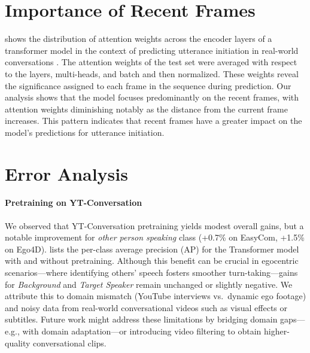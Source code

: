 \documentclass[11pt]{article}
\begin{document}

\section {Importance of Recent Frames}

 shows the distribution of attention weights across the encoder layers of a transformer model in the context of predicting utterance initiation in real-world conversations \cite{wang2021oadtr}. The attention weights of the test set were averaged with respect to the layers, multi-heads, and batch and then normalized.  These weights reveal the significance assigned to each frame in the sequence during prediction. Our analysis shows that the model focuses predominantly on the recent frames, with attention weights diminishing notably as the distance from the current frame increases. This pattern indicates that recent frames have a greater impact on the model's predictions for utterance initiation. 




\section{Error Analysis}
\label{app:error_analysis}
\paragraph{Pretraining on YT-Conversation}

We observed that YT-Conversation pretraining yields modest overall gains, but a notable improvement for \emph{other person speaking} class (+0.7\% on EasyCom, +1.5\% on Ego4D). 
 lists the per-class average precision (AP) for the Transformer 
model with and without pretraining. Although this benefit can be crucial in egocentric 
scenarios—where identifying others’ speech fosters smoother turn-taking—gains for 
\textit{Background} and \textit{Target Speaker} remain unchanged or slightly negative. 
We attribute this to domain mismatch (YouTube interviews vs.\ dynamic ego footage) 
and noisy data from real-world conversational videos such as visual effects or subtitles. Future work might address these limitations by bridging domain gaps—e.g., with domain adaptation—or introducing video filtering to obtain higher-quality conversational clips.
\end{document}
